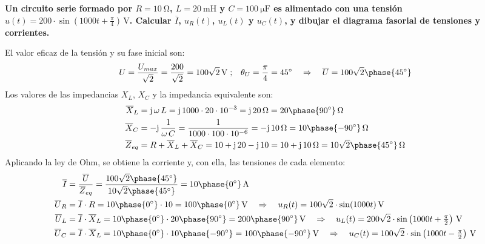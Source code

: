 	\vspace{4mm}
	\begin{example}\label{ej.2-3}
		\textbf{Un circuito serie formado por $R=\qty{10}{\ohm}$, $L=\qty{20}{\milli\henry}$ y $C=\qty{100}{\micro\farad}$ es alimentado con una tensión $u(t)=200\cdot\sin(1000t+\frac{\pi}{4})\,\si{\volt}$. Calcular $\overline{I}$, ${u_R(t)}$, $u_L(t)$ y $u_C(t)$, y dibujar el diagrama fasorial de tensiones y corrientes.}

  \vspace{4mm}
		El valor eficaz de la tensión y su fase inicial son:
		\begin{equation*}
			U = \dfrac{U_{max}}{\sqrt{2}} =\dfrac{200}{\sqrt{2}} = 100\sqrt2\,\si{\volt} \;;\;\;\;\theta_U=\dfrac{\pi}{4}=45^\circ \quad \Rightarrow \quad\overline{U}=100\sqrt2\phase{\ang{45}}
		\end{equation*}
		Los valores de las impedancias $X_L$, $X_C$ y la impedancia equivalente son:
		\begin{align*}
			\overline{X}_L&=\mathrm{j}\,\omega\,L=\mathrm{j}\,1000\cdot20\cdot 10^{-3}= \mathrm{j}\,\qty{20}{\ohm}=20\phase{\ang{90}}\,\si{\ohm}\\
			\overline{X}_C&=-\mathrm{j}\,\dfrac{1}{\omega\,C}=\dfrac{1}{1000\cdot100\cdot 10^{-6}}= -\mathrm{j}\,\qty{10}{\ohm}=10\phase{\ang{-90}}\,\si{\ohm}		\\
			\overline{Z}_{eq}&=R+\overline{X}_L+\overline{X}_C=10+\mathrm{j}\,20-\mathrm{j}\,10=10+\mathrm{j}\,10\,\si{\ohm}=10\sqrt2 \phase{\ang{45}}\,\si{\ohm}
		\end{align*}
		Aplicando la ley de Ohm, se obtiene la corriente y, con ella, las tensiones de cada elemento:
		\begin{align*}
			\overline{I}&=\dfrac{\overline{U}}{\overline{Z}_{eq}}=\dfrac{100\sqrt2\phase{45^\circ}}{10\sqrt2\phase{45^\circ}}=10\phase{0^\circ}\,\si{\ampere}\\
			\overline{U}_R&=\overline{I}\cdot R=10\phase{0^\circ}\cdot 10=100\phase{0^\circ}\,\si{\volt} \quad \Rightarrow \quad u_R(t)=100\sqrt{2}\cdot\sin(1000t)\,\si{\volt}\\
			\overline{U}_L&=\overline{I}\cdot \overline{X}_L=10\phase{0^\circ}\cdot 20\phase{90^\circ}=200\phase{90^\circ}\,\si{\volt} \quad \Rightarrow \quad u_L(t)=200\sqrt{2}\cdot\sin\left(1000t+\tfrac{\pi}{2}\right)\,\si{\volt}\\
			\overline{U}_C&=\overline{I}\cdot \overline{X}_L=10\phase{0^\circ}\cdot 10\phase{-90^\circ} =100\phase{-90^\circ}\,\si{\volt} \quad \Rightarrow \quad u_C(t)=100\sqrt{2}\cdot\sin\left(1000t-\tfrac{\pi}{2}\right)\,\si{\volt}

\end{align*}
\end{example}

